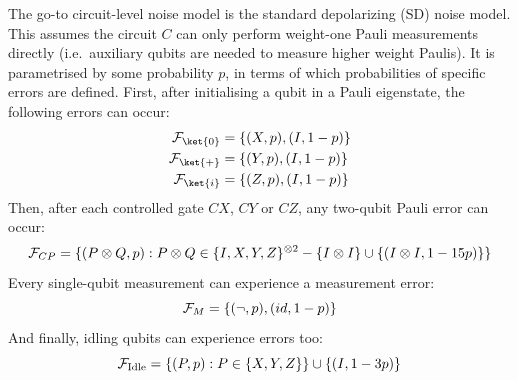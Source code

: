 \begin{example}
    The go-to circuit-level noise model is the standard depolarizing (SD) noise model.
    This assumes the circuit $C$ can only perform weight-one Pauli measurements directly (i.e.\ auxiliary qubits are needed to measure higher weight Paulis).
    It is parametrised by some probability $p$, in terms of which probabilities of specific errors are defined.
    First, after initialising a qubit in a Pauli eigenstate, the following errors can occur:
    \begin{equation}
        \begin{aligned}
            \FFF_{\ket{0}} &= \{(X, p), (I, 1-p)\}\\
            \FFF_{\ket{+}} &= \{(Y, p), (I, 1-p)\}\\
            \FFF_{\ket{i}} &= \{(Z, p), (I, 1-p)\}
        \end{aligned}
    \end{equation}
    Then, after each controlled gate $CX$, $CY$ or $CZ$, any two-qubit Pauli error can occur:
    \begin{equation}
            \mathcal{F}_{CP} = \{(P \otimes Q, p) : P \otimes Q \in \{I, X, Y, Z\}^{\otimes 2} - \{I \otimes I\} \cup \{(I \otimes I, 1-15p)\}\}
    \end{equation}
    Every single-qubit measurement can experience a measurement error:
    \begin{equation}
        \mathcal{F}_M = \{(\neg, p), (id, 1-p)\}
    \end{equation}
    And finally, idling qubits can experience errors too:
    \begin{equation}
        \mathcal{F}_{\text{Idle}} = \{(P, p) : P \in \{X, Y, Z\}\} \cup \{(I, 1 - 3p)\}
    \end{equation}
\end{example}
%
